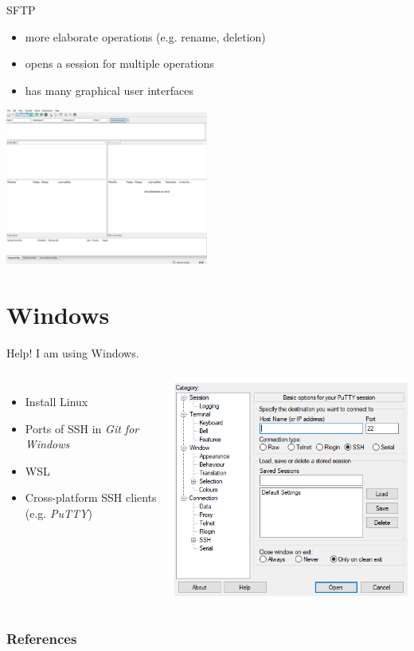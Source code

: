 \documentclass[10pt,graphics,aspectratio=169,table]{beamer}
\begin{document}
\begin{frame}[fragile]{SFTP}
\begin{itemize}
    \item more elaborate operations (e.g. rename, deletion)
    \item opens a session for multiple operations
    \item has many graphical user interfaces
\end{itemize}
\begin{center}
    \includegraphics[width=0.5\textwidth]{img/filezilla.png} \cite{filezilla}
\end{center}
\end{frame}

\section{Windows}
\begin{frame}[fragile]{Help! I am using Windows.}
\begin{columns}
        \begin{itemize}
            \item Install Linux
            \item Ports of SSH in \textit{Git for Windows}
            \item WSL
            \item Cross-platform SSH clients (e.g. \textit{PuTTY})
        \end{itemize}
        \includegraphics[height=0.7\paperheight]{img/putty.png} \cite{putty}
\end{columns}
\end{frame}

\begin{frame}[allowframebreaks]
        \frametitle{References}
        
        \nocite{*}
        
\end{frame}
\end{document}
